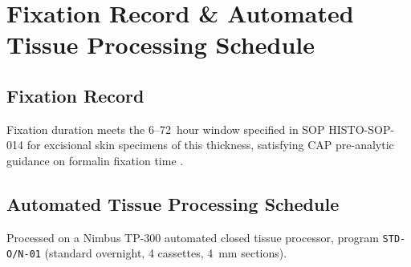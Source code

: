 \section{Fixation Record \& Automated Tissue Processing Schedule}
\label{sec:fixation}

\subsection{Fixation Record}

\vspace{4pt}
Fixation duration meets the 6--72~hour window specified in SOP HISTO-SOP-014 for excisional
skin specimens of this thickness, satisfying CAP pre-analytic guidance on formalin fixation
time \citep{werner2000effect}.

\subsection{Automated Tissue Processing Schedule}
Processed on a Nimbus TP-300 automated closed tissue processor, program \texttt{STD-O/N-01}
(standard overnight, 4 cassettes, 4~mm sections).

